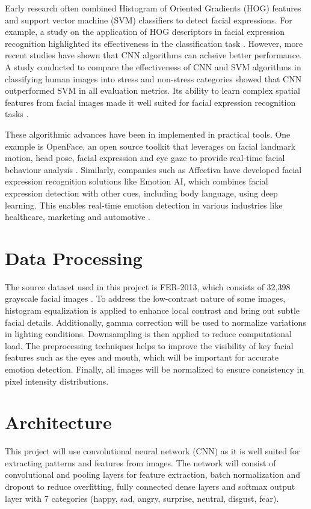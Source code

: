 \documentclass[final]{article}
\begin{document}
Early research often combined Histogram of Oriented Gradients (HOG) features and support vector machine (SVM) classifiers to detect facial expressions. For example, a study on the application of HOG descriptors in facial expression recognition highlighted its effectiveness in the classification task \citep{carcagni2015hog}. However, more recent studies have shown that CNN algorithms can acheive better performance. A study conducted to compare the effectiveness of CNN and SVM algorithms in classifying human images into stress and non-stress categories showed that CNN outperformed SVM in all evaluation metrics. Its ability to learn complex spatial features from facial images made it well suited for facial expression recognition tasks \citep{royan2025cnnsvm}.

These algorithmic advances have been in implemented in practical tools. One example is OpenFace, an open source toolkit that leverages on facial landmark motion, head pose, facial expression and eye gaze to provide real-time facial behaviour analysis \citep{baltrusaitis2016openface}. Similarly, companies such as Affectiva have developed facial expression recognition solutions like Emotion AI, which combines facial expression detection with other cues, including body language, using deep learning. This enables real-time emotion detection in various industries like healthcare, marketing and automotive \citep{affectiva_emotionAI}.


\section*{Data Processing}
The source dataset used in this project is FER-2013, which consists of 32,398 grayscale facial images \citep{sambare2017fer2013}. To address the low-contrast nature of some images, histogram equalization is applied to enhance local contrast and bring out subtle facial details. Additionally, gamma correction will be used to normalize variations in lighting conditions. Downsampling is then applied to reduce computational load. The preprocessing techniques helps to improve the visibility of key facial features such as the eyes and mouth, which will be important for accurate emotion detection. Finally, all images will be normalized to ensure consistency in pixel intensity distributions.

\section*{Architecture}
This project will use convolutional neural network (CNN) as it is well suited for extracting patterns and features from images. The network will consist of convolutional and pooling layers for feature extraction, batch normalization and dropout to reduce overfitting, fully connected dense layers and softmax output layer with 7 categories (happy, sad, angry, surprise, neutral, disgust, fear).
\end{document}
